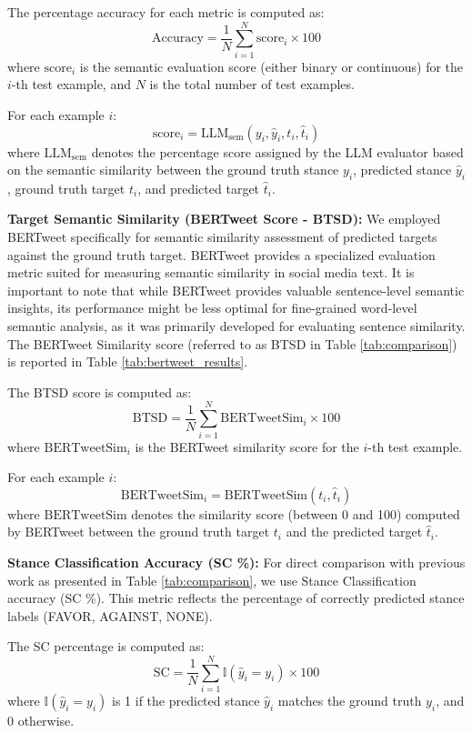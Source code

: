 \documentclass[twocolumn,11pt,letterpaper]{article}
\begin{document}
The percentage accuracy for each metric is computed as:
\[
\text{Accuracy} = \frac{1}{N} \sum_{i=1}^{N} \text{score}_i \times 100
\]
where $\text{score}_i$ is the semantic evaluation score (either binary or continuous) for the $i$-th test example, and $N$ is the total number of test examples.

For each example $i$:
\[
\text{score}_i = \text{LLM}_\text{sem}(y_i, \hat{y}_i, t_i, \hat{t}_i)
\]
where $\text{LLM}_\text{sem}$ denotes the percentage score assigned by the LLM evaluator based on the semantic similarity between the ground truth stance $y_i$, predicted stance $\hat{y}_i$, ground truth target $t_i$, and predicted target $\hat{t}_i$.

\textbf{Target Semantic Similarity (BERTweet Score - BTSD):} We employed BERTweet \cite{bertweet} specifically for semantic similarity assessment of predicted targets against the ground truth target. BERTweet provides a specialized evaluation metric suited for measuring semantic similarity in social media text. It is important to note that while BERTweet provides valuable sentence-level semantic insights, its performance might be less optimal for fine-grained word-level semantic analysis, as it was primarily developed for evaluating sentence similarity. The BERTweet Similarity score (referred to as BTSD in Table \ref{tab:comparison}) is reported in Table \ref{tab:bertweet_results}.

The BTSD score is computed as:
\[
\text{BTSD} = \frac{1}{N} \sum_{i=1}^{N} \text{BERTweetSim}_i \times 100
\]
where $\text{BERTweetSim}_i$ is the BERTweet similarity score for the $i$-th test example.

For each example $i$:
\[
\text{BERTweetSim}_i = \text{BERTweetSim}(t_i, \hat{t}_i)
\]
where $\text{BERTweetSim}$ denotes the similarity score (between 0 and 100) computed by BERTweet between the ground truth target $t_i$ and the predicted target $\hat{t}_i$.

\textbf{Stance Classification Accuracy (SC \%):} For direct comparison with previous work as presented in Table \ref{tab:comparison}, we use Stance Classification accuracy (SC \%). This metric reflects the percentage of correctly predicted stance labels (FAVOR, AGAINST, NONE).

The SC percentage is computed as:
\[
\text{SC} = \frac{1}{N} \sum_{i=1}^{N} \mathbb{I}(\hat{y}_i = y_i) \times 100
\]
where $\mathbb{I}(\hat{y}_i = y_i)$ is 1 if the predicted stance $\hat{y}_i$ matches the ground truth $y_i$, and 0 otherwise.
\end{document}
